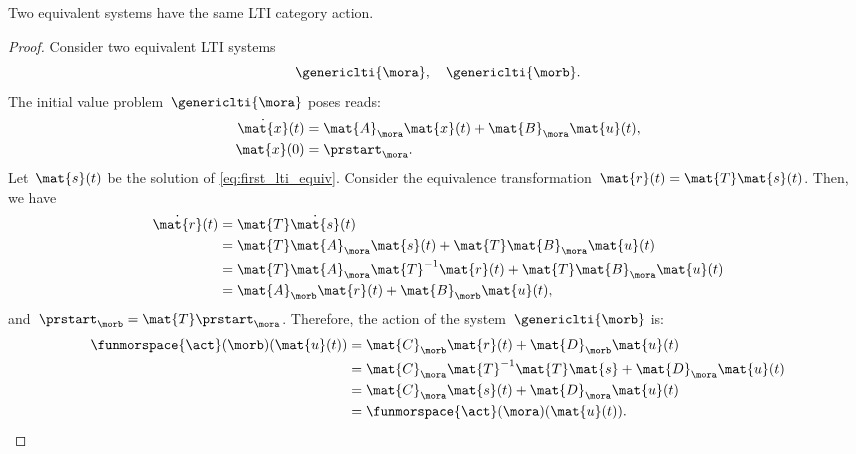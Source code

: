 \begin{lemma}
    \label{lem:equivsystequivact}
    Two equivalent systems have the same LTI category action.
\end{lemma}
\begin{proof}
    Consider two equivalent LTI systems
    \begin{equation}
        \genericlti{\mora},\quad \genericlti{\morb}.
    \end{equation}
    The initial value problem~$\genericlti{\mora}$ poses reads:
    \begin{equation}
        \label{eq:first_lti_equiv}
        \begin{aligned}
            \dot{\mat{x}}(t) & =\mat{A}_{\mora}\mat{x}(t)+\mat{B}_{\mora}\mat{u}(t), \\
            \mat{x}(0)       & = \prstart_\mora.
        \end{aligned}
    \end{equation}
    Let~$\mat{s}(t)$ be the solution of \cref{eq:first_lti_equiv}.
    Consider the equivalence transformation~$\mat{r}(t)\linebreak[0]=\mat{T}\mat{s}(t)$.
    Then, we have
    \begin{equation}
        \begin{aligned}
            \dot{\mat{r}}(t) & =\mat{T}\dot{\mat{s}}(t) \\
                             & =\mat{T}\mat{A}_\mora \mat{s}(t)+\mat{T}\mat{B}_\mora \mat{u}(t) \\
                             & =\mat{T}\mat{A}_\mora \mat{T}^{-1}\mat{r}(t)+\mat{T}\mat{B}_\mora \mat{u}(t) \\
                             & =\mat{A}_\morb\mat{r}(t)+\mat{B}_\morb \mat{u}(t),
        \end{aligned}
    \end{equation}
    and~$ \prstart_\morb=\mat{T} \prstart_\mora$.
    Therefore, the action of the system~$\genericlti{\morb}$ is:
    \begin{equation}
        \begin{aligned}
            \funmorspace{\act}(\morb)(\mat{u}(t)) & =\mat{C}_\morb \mat{r}(t)+ \mat{D}_\morb \mat{u}(t) \\
                                                  & =\mat{C}_\mora \mat{T}^{-1}\mat{T}\mat{s}+\mat{D}_\mora \mat{u}(t) \\
                                                  & =\mat{C}_\mora \mat{s}(t)+\mat{D}_\mora \mat{u}(t) \\
                                                  & =\funmorspace{\act}(\mora)(\mat{u}(t)).
        \end{aligned}
    \end{equation}
\end{proof}

